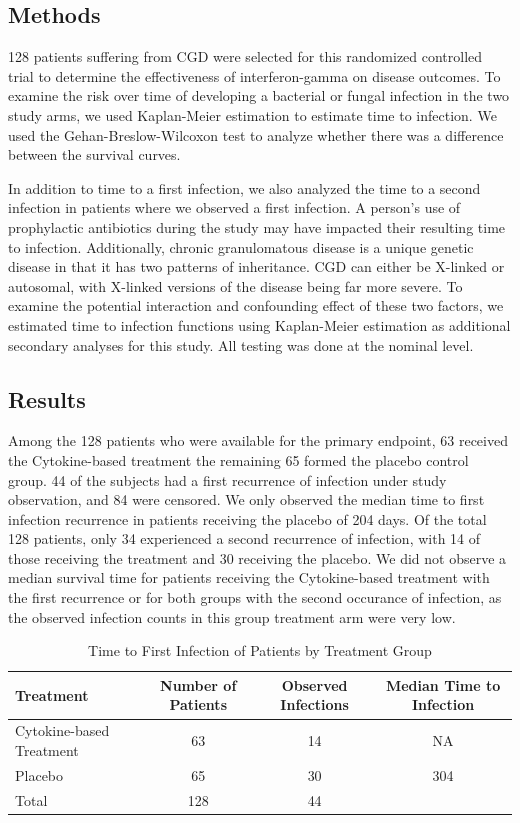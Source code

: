 \documentclass{article}
\begin{document}
	\subsection*{Methods}
	128 patients suffering from CGD were selected for this randomized controlled trial to determine the effectiveness of interferon-gamma on disease outcomes. To examine the risk over time of developing a bacterial or fungal infection in the two study arms, we used Kaplan-Meier estimation to estimate time to infection. We used the Gehan-Breslow-Wilcoxon test to analyze whether there was a difference between the survival curves.

	In addition to time to a first infection, we also analyzed the time to a second infection in patients where we observed a first infection. A person’s use of prophylactic antibiotics during the study may have impacted their resulting time to infection. Additionally, chronic granulomatous disease is a unique genetic disease in that it has two patterns of inheritance. CGD can either be X-linked or autosomal, with X-linked versions of the disease being far more severe. To examine the potential interaction and confounding effect of these two factors, we estimated time to infection functions using Kaplan-Meier estimation as additional secondary analyses for this study. All testing was done at the nominal level.

	\subsection*{Results}
	Among the 128 patients who were available for the primary endpoint, 63 received the Cytokine-based treatment the remaining 65 formed the placebo control group. 44 of the subjects had a first recurrence of infection under study observation, and 84 were censored. We only observed the median time to first infection recurrence in patients receiving the placebo of 204 days. Of the total 128 patients, only 34 experienced a second recurrence of infection, with 14 of those receiving the treatment and 30 receiving the placebo. We did not observe a median survival time for patients receiving the Cytokine-based treatment with the first recurrence or for both groups with the second occurance of infection, as the observed infection counts in this group treatment arm were very low. 

	\begin{table}[ht]
		\centering
		\footnotesize
		\caption{Time to First Infection of Patients by Treatment Group}
		\begin{tabular}{lccc}
		\toprule
		\textbf{Treatment} & \textbf{Number of Patients} & \textbf{Observed Infections} & \textbf{Median Time to Infection} \\
		\midrule
		Cytokine-based Treatment & 63 & 14 & NA \\
		Placebo & 65 & 30 & 304 \\
		\midrule
		Total & 128 & 44 & \\
		\bottomrule
		\end{tabular}
	\end{table}
\end{document}
